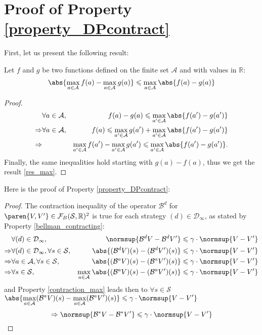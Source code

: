 \section{Proof of Property \ref{property_DPcontract}}
First, let us present the following result:
\begin{Property}
Let $f$ and $g$ be two functions defined on the finite set $\mathcal{A}$ 
and with values in $\mathbb{R}$:
\begin{equation}
\label{res_max}
 \abs{\max_{a \in \mathcal{A}}f(a) - \max_{a \in \mathcal{A}}g(a)} \leqslant \max_{a \in \mathcal{A}} \abs{f(a)-g(a)}
\end{equation}
\label{contraction_max}
\end{Property}
\begin{proof}
\begin{eqnarray*}
& \forall a \in \mathcal{A}, & f(a) - g(a) \leqslant \max_{a' \in \mathcal{A}} \abs{ f(a') - g(a') } \\
 \Rightarrow & \forall a \in \mathcal{A}, & f(a) \leqslant \max_{a' \in \mathcal{A}} g(a') + \max_{a' \in \mathcal{A}} \abs{f(a')-g(a')}  \\ 
 \Rightarrow &  & \max_{a' \in \mathcal{A}} f(a') - \max_{a' \in \mathcal{A}} g(a') \leqslant \max_{a' \in \mathcal{A}} \abs{f(a')-g(a')}.
\end{eqnarray*}
Finally, the same inequalities hold starting with $g(a) - f(a)$, 
thus we get the result \ref{res_max}.
\end{proof}
Here is the proof of Property \ref{property_DPcontract}:
\begin{proof}
The contraction inequality of the operator $\mathcal{B}^d$ for $\paren{V,V'} \in \mathcal{F}_{B} (\mathcal{S},\mathbb{R})^2$
is true for each strategy $(d) \in \mathcal{D}_{\infty}$, 
as stated by Property \ref{bellman_contracting}:
\begin{eqnarray*}
& \forall (d) \in \mathcal{D}_{\infty}, & \normsup{\mathcal{B}^d V - \mathcal{B}^d V'}   \leqslant \gamma \cdot \normsup{V-V'} \\
\Rightarrow & \forall (d) \in \mathcal{D}_{\infty}, \forall s \in \mathcal{S}, & \abs{(\mathcal{B}^{d} V)(s) - (\mathcal{B}^d V')(s)} \leqslant \gamma \cdot \normsup{V-V'} \\
\Rightarrow & \forall a \in \mathcal{A}, \forall s \in \mathcal{S}, & \abs{(\mathcal{B}^aV)(s) - (\mathcal{B}^aV')(s)} \leqslant \gamma \cdot \normsup{V-V'} \\
\Rightarrow &  \forall s \in \mathcal{S}, & \max_{a \in \mathcal{A}} \abs{(\mathcal{B}^aV)(s) - (\mathcal{B}^aV')(s)} \leqslant \gamma \cdot \normsup{V-V'}
\end{eqnarray*}
and Property \ref{contraction_max} leads then to $\forall s \in \mathcal{S}$ $ \displaystyle \abs{ \max_{a \in \mathcal{A}}(\mathcal{B}^aV)(s) - \max_{a \in \mathcal{A}} (\mathcal{B}^aV')(s)} \leqslant \gamma \cdot \normsup{V-V'} $ \\
\[\Rightarrow \normsup{\mathcal{B}^*V-\mathcal{B}^*V'} \leqslant \gamma \cdot \normsup{V-V'}  \]
\end{proof}






